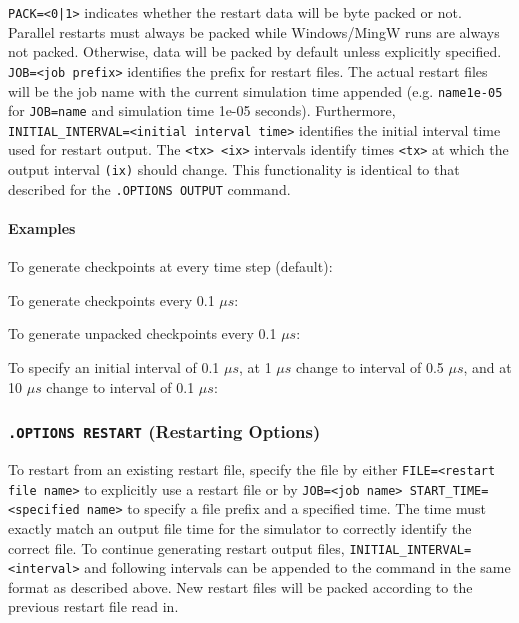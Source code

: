 {{\texttt{PACK=<0|1>} indicates whether the restart data will be byte packed
or not.  Parallel restarts must always be packed while Windows/MingW
runs are always not packed.  Otherwise, data will be packed by default unless
explicitly specified.
\texttt{JOB=<job prefix>} identifies the prefix for restart files.  The
actual restart files will be the job name with the current simulation time
appended (e.g. \texttt{name1e-05} for \texttt{JOB=name} and simulation time
1e-05 seconds).  Furthermore, \texttt{INITIAL\_INTERVAL=<initial interval
  time>} identifies the initial interval time used for restart output.  The
\texttt{<tx> <ix>} intervals identify times \texttt{<tx>} at which the output
interval \texttt{(ix)} should change.  This functionality is identical to
that described for the \texttt{.OPTIONS OUTPUT} command.

\paragraph{Examples}

To generate checkpoints at every time step (default):


To generate checkpoints every 0.1 $\mu s$:


To generate unpacked checkpoints every 0.1 $\mu s$:


To specify an initial interval of 0.1 $\mu s$, at 1 $\mu s$ change to interval
of 0.5 $\mu s$, and at 10 $\mu s$ change to interval of 0.1 $\mu s$:


\subsubsection{\texttt{.OPTIONS RESTART} (Restarting Options)}

To restart from an existing restart file, specify the file
by either \texttt{FILE=<restart file name>} to explicitly use a restart file or
by \texttt{JOB=<job name> START\_TIME=<specified name>} to specify a file
prefix and a specified time.  The time must exactly match an output file time
for the simulator to correctly identify the correct file.  To continue
generating restart output files, \texttt{INITIAL\_INTERVAL=<interval>} and
following intervals can be appended to the command in the same format as
described above.  New restart files will be packed according to the previous
restart file read in.  

}}
